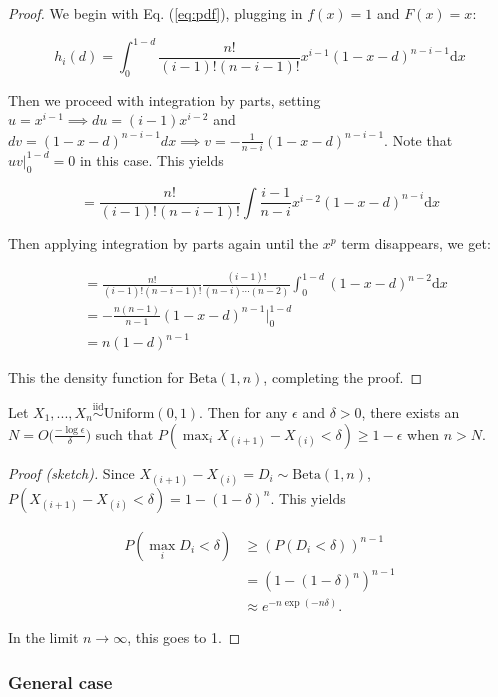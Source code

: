 \documentclass[
  11pt,
]{article}
\begin{document}
\begin{proof}
We begin with Eq. (\ref{eq:pdf}), plugging in $f(x) = 1$ and $F(x) = x$:

$$
h_i(d) = \int_0^{1-d} \frac{n!}{(i-1)! (n-i-1)!} x^{i-1} (1-x-d)^{n-i-1} \mathrm{d}x
$$

Then we proceed with integration by parts, setting 
$u = x^{i-1} \implies du = (i-1) x^{i-2}$ and 
$dv = (1-x-d)^{n-i-1} dx \implies v = -\frac{1}{n-i} (1-x-d)^{n-i-1}$. 
Note that $u v |_0^{1-d} = 0$ in this case. This yields

$$
= \frac{n!}{(i-1)! (n-i-1)!} \int \frac{i-1}{n-i} x^{i-2} (1-x-d)^{n-i} \mathrm{d}x
$$

Then applying integration by parts again until the $x^p$ term disappears, we get:

$$
\begin{aligned}
& = \frac{n!}{(i-1)! (n-i-1)!} \frac{(i-1)!}{(n-i) \cdots (n-2)} \int_0^{1-d} (1-x-d)^{n-2} \mathrm{d}x \\
& = -\frac{n (n-1)}{n-1} (1-x-d)^{n-1} \Big|_0^{1-d} \\
& = n (1 - d)^{n-1}
\end{aligned}
$$

This the density function for $\mathrm{Beta}(1, n)$, completing the proof.
\end{proof}

\begin{theorem}
Let $X_1, ..., X_n \stackrel{\mathrm{iid}}{\sim}\mathrm{Uniform}(0, 1)$. 
Then for any $\epsilon$ and $\delta > 0$, 
there exists an $N = O \big(\frac{-\log \epsilon}{\delta} \big)$ such that 
$P(\max_i X_{(i+1)} - X_{(i)} < \delta) \geq 1 - \epsilon$ when $n > N$.
\end{theorem}

\begin{proof}[Proof (sketch)]
Since $X_{(i+1)} - X_{(i)} = D_i \sim \mathrm{Beta}(1, n)$, 
$P(X_{(i+1)} - X_{(i)} < \delta) = 1 - (1 - \delta)^n $. This yields

$$
\begin{aligned}
P(\max_i D_i < \delta) & \geq (P(D_i < \delta))^{n-1} \\
& = (1 - (1 - \delta)^n)^{n-1} \\
& \approx e^{-n \exp(-n \delta)}.
\end{aligned}
$$

In the limit $n \to \infty$, this goes to 1.
\end{proof}

\hypertarget{general-case}{%
\subsubsection{General case}\label{general-case}}
\end{document}

